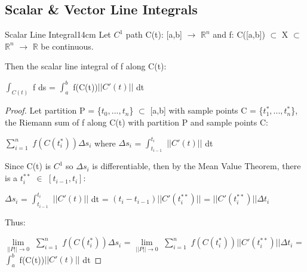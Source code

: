     \vspace{0.5cm}





\subsection{ Scalar \& Vector Line Integrals }

    \begin{wtheorem}{Scalar Line Integral}{14cm}
        Let $C^1$ path C(t): [a,b] $\rightarrow$ $\mathbb{R}^n$
        and f: C([a,b]) $\subset$ X $\subset$ $\mathbb{R}^n$ $\rightarrow$
        $\mathbb{R}$ be continuous.

        Then the {\color{lblue} scalar line integral}
        of f along C(t):

        \hspace{0.5cm}
        $\int_{C(t)}$ f ds = $\int_a^b$ f(C(t))$|| C'(t) ||$ dt
    \end{wtheorem}

    \begin{proof}
        Let partition P = \{$t_0,...,t_n$\} $\subset$ [a,b]
        with sample points C = \{$t_1^*,...,t_n^*$\},
        the Riemann sum of f along C(t) with partition P and sample points C:

        \hspace{0.5cm}
        $\sum_{i=1}^n$ $f(C(t_i^*)) \Delta s_i$
        \hspace{1cm}
        where $\Delta s_i$ = $\int_{t_{i-1}}^{t_i}$ $||C'(t)||$ dt

        Since C(t) is $C^1$ so $\Delta s_i$ is differentiable, then
        by the Mean Value Theorem, there is a $t_i^{**}$ $\in$ $[t_{i-1},t_i]$:

        \hspace{0.5cm}
        $\Delta s_i$ = $\int_{t_{i-1}}^{t_i}$ $||C'(t)||$ dt
        = $(t_i - t_{i-1})||C'(t_i^{**})||$
        = $||C'(t_i^{**})|| \Delta t_i$

        Thus:

        $\underset{||P|| \rightarrow 0}{\lim}$
            $\sum_{i=1}^n$ $f(C(t_i^*)) \Delta s_i$
        = $\underset{||P|| \rightarrow 0}{\lim}$
            $\sum_{i=1}^n$ $f(C(t_i^*)) ||C'(t_i^{**})|| \Delta t_i$
        = $\int_a^b$ f(C(t))$|| C'(t) ||$ dt
    \end{proof}

    \newpage





